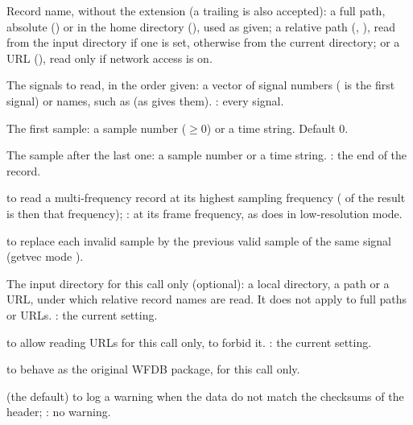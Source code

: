 \begin{params}
\item[record] Record name, without the  extension (a trailing  is
  also accepted): a full path, absolute () or in the home
  directory (), used as given; a relative path
  (, ), read from the input directory if one is set,
  otherwise from the current directory; or a URL
  (), read only if network access is
  on.
\item[channels] The signals to read, in the order given: a vector of signal numbers
  ( is the first signal) or names, such as \code{["V5"]} (as
   gives them). : every signal.
\item[from] The first sample: a sample number ($\ge 0$) or a time string. Default 0.
\item[to] The sample after the last one: a sample number or a time string.
  : the end of the record.
\item[highres]  to read a multi-frequency record at its highest sampling
  frequency ( of the result is then that frequency); : at its frame
  frequency, as  does in low-resolution mode.
\item[pad]  to replace each invalid sample by the previous valid sample of
  the same signal (getvec mode ).
\item[input\_dir] The input directory for this call only (optional): a local directory,
  a \code{\textasciitilde} path or a URL, under which relative record names are read. It
  does not apply to full paths or URLs. : the current setting.
\item[network]  to allow reading URLs for this call only,  to
  forbid it. : the current setting.
\item[legacy]  to behave as the original WFDB package, for this call only.
\item[checksum\_warning]  (the default) to log a warning when the data do not
  match the checksums of the header; : no warning.
\end{params}
